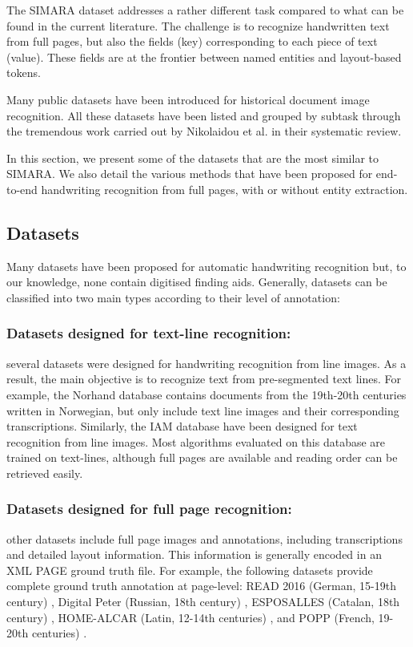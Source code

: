 \documentclass[runningheads]{llncs}
\begin{document}
The SIMARA dataset addresses a rather different task compared to what can be found in the current literature. The challenge is to recognize handwritten text from full pages, but also the fields (key) corresponding to each piece of text (value). 
These fields are at the frontier between named entities and layout-based tokens. 

Many public datasets have been introduced for historical document image recognition. All these datasets have been listed and grouped by subtask through the tremendous work carried out by Nikolaidou et al. \cite{Nikolaidou2022} in their systematic review. 

In this section, we present some of the datasets that are the most similar to SIMARA. We also detail the various methods that have been proposed for end-to-end handwriting recognition from full pages, with or without entity extraction.

\subsection{Datasets}
Many datasets have been proposed for automatic handwriting recognition but, to our knowledge, none contain digitised finding aids. Generally, datasets can be classified into two main types according to their level of annotation:

\subsubsection{Datasets designed for text-line recognition:}

several datasets were designed for handwriting recognition from line images. As a result, the main objective is to recognize text from pre-segmented text lines.
For example, the Norhand database \cite{NorHand} contains documents from the 19th-20th centuries written in Norwegian, but only include text line images and their corresponding transcriptions.
Similarly, the IAM \cite{IAM} database have been designed for text recognition from line images. Most algorithms evaluated on this database are trained on text-lines, although full pages are available and reading order can be retrieved easily.

\subsubsection{Datasets designed for full page recognition:}

other datasets include full page images and annotations, including transcriptions and detailed layout information. This information is generally encoded in an XML PAGE ground truth file.
For example, the following datasets provide complete ground truth annotation at page-level: READ 2016 (German, 15-19th century) \cite{READ2016}, Digital Peter (Russian, 18th century) \cite{DigitalPeter}, ESPOSALLES (Catalan, 18th century) \cite{iehhr2017}, HOME-ALCAR (Latin, 12-14th centuries) \cite{HOME-ALCAR}, and POPP (French, 19-20th centuries) \cite{Constum-POPP}. 
\end{document}
